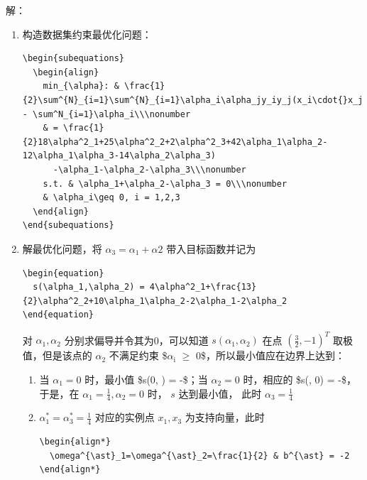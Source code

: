 \documentclass[11pt]{ctexart}
\begin{document}
\begin{enumerate}
\begin{enumerate}
解：
\begin{enumerate}
\item 构造数据集约束最优化问题：
\lstset{language=[LaTeX]TeX,label= ,caption= ,captionpos=b,numbers=none}
\begin{lstlisting}
\begin{subequations}
  \begin{align}
    min_{\alpha}: & \frac{1}{2}\sum^{N}_{i=1}\sum^{N}_{i=1}\alpha_i\alpha_jy_iy_j(x_i\cdot{}x_j) - \sum^N_{i=1}\alpha_i\\\nonumber
    & = \frac{1}{2}18\alpha^2_1+25\alpha^2_2+2\alpha^2_3+42\alpha_1\alpha_2-12\alpha_1\alpha_3-14\alpha_2\alpha_3)
      -\alpha_1-\alpha_2-\alpha_3\\\nonumber
    s.t. & \alpha_1+\alpha_2-\alpha_3 = 0\\\nonumber 
    & \alpha_i\geq 0, i = 1,2,3
  \end{align}
\end{subequations}
\end{lstlisting}
\item 解最优化问题，将 \(\alpha_3=\alpha_1+\alpha2\) 带入目标函数并记为
\lstset{language=[LaTeX]TeX,label= ,caption= ,captionpos=b,numbers=none}
\begin{lstlisting}
\begin{equation}
  s(\alpha_1,\alpha_2) = 4\alpha^2_1+\frac{13}{2}\alpha^2_2+10\alpha_1\alpha_2-2\alpha_1-2\alpha_2
\end{equation}
\end{lstlisting}
对 \(\alpha_1, \alpha_2\) 分别求偏导并令其为0，可以知道 \(s(\alpha_1, \alpha_2)\) 在点 \((\frac{3}{2}, -1)^T\)
取极值，但是该点的 \(\alpha_2\) 不满足约束 \$\(\alpha_{\text{i}}\) \(\ge\) 0\$，所以最小值应在边界上达到：
\begin{enumerate}
\item 当 \(\alpha_1 = 0\) 时，最小值 \$s(0, ) = -\$；当 \(\alpha_2=0\) 时，相应的
\$s(, 0) = -\$，于是，在 \(\alpha_1=\frac{1}{4}, \alpha_2=0\) 时， \(s\) 达到最小值，
此时 \(\alpha_3 = \frac{1}{4}\)
\item \(\alpha^{\ast}_1=\alpha^{\ast}_3=\frac{1}{4}\) 对应的实例点 \(x_1, x_3\) 为支持向量，此时
\lstset{language=[LaTeX]TeX,label= ,caption= ,captionpos=b,numbers=none}
\begin{lstlisting}
\begin{align*}
  \omega^{\ast}_1=\omega^{\ast}_2=\frac{1}{2} & b^{\ast} = -2
\end{align*}
\end{lstlisting}

\end{enumerate}
\end{enumerate}
\end{enumerate}
\end{enumerate}
\end{document}
